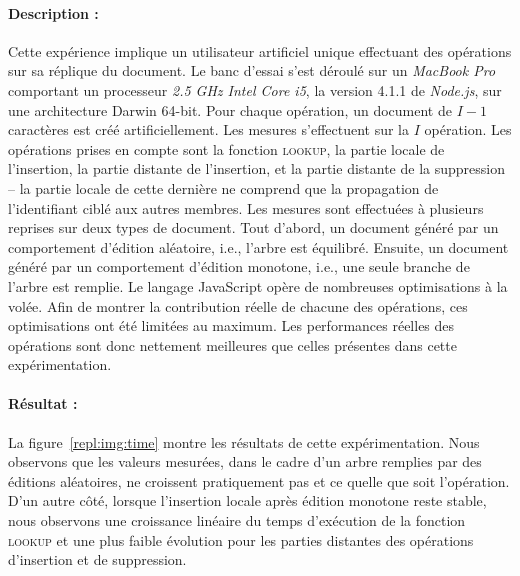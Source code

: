 \paragraph{Description :} Cette expérience implique un utilisateur artificiel
unique effectuant des opérations sur sa réplique du document. Le banc d'essai
s'est déroulé sur un \emph{MacBook Pro} comportant un processeur \emph{2.5 GHz
  Intel Core i5}, la version 4.1.1 de \emph{Node.js}, sur une architecture
Darwin 64-bit. Pour chaque opération, un document de $I-1$ caractères est créé
artificiellement. Les mesures s'effectuent sur la $I$ opération. Les
opérations prises en compte sont la fonction \textsc{lookup}, la partie locale
de l'insertion, la partie distante de l'insertion, et la partie distante de la
suppression -- la partie locale de cette dernière ne comprend que la propagation
de l'identifiant ciblé aux autres membres. Les mesures sont effectuées à
plusieurs reprises sur deux types de document. Tout d'abord, un document généré
par un comportement d'édition aléatoire, i.e., l'arbre \LSEQ est
équilibré. Ensuite, un document généré par un comportement d'édition monotone,
i.e., une seule branche de l'arbre \LSEQ est remplie. 
Le langage JavaScript opère de nombreuses optimisations à la volée. Afin
de montrer la contribution réelle de chacune des opérations, ces optimisations
ont été limitées au maximum. Les performances réelles des opérations sont donc
nettement meilleures que celles présentes dans cette expérimentation.

\paragraph{Résultat :} La figure~\ref{repl:img:time} montre les résultats de
cette expérimentation. Nous observons que les valeurs mesurées, dans le cadre
d'un arbre remplies par des éditions aléatoires, ne croissent pratiquement pas
et ce quelle que soit l'opération. D'un autre côté, lorsque l'insertion locale
après édition monotone reste stable, nous observons une croissance linéaire du
temps d'exécution de la fonction \textsc{lookup} et une plus faible évolution
pour les parties distantes des opérations d'insertion et de suppression.

